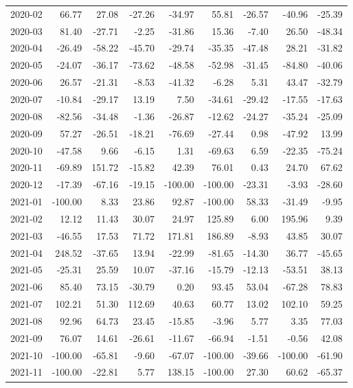 \begin{table}[ht]
\begin{tabular}{lrrrrrrrr}
  2020-02 & 66.77 & 27.08 & -27.26 & -34.97 & 55.81 & -26.57 & -40.96 & -25.39 \\ 
  2020-03 & 81.40 & -27.71 & -2.25 & -31.86 & 15.36 & -7.40 & 26.50 & -48.34 \\ 
  2020-04 & -26.49 & -58.22 & -45.70 & -29.74 & -35.35 & -47.48 & 28.21 & -31.82 \\ 
  2020-05 & -24.07 & -36.17 & -73.62 & -48.58 & -52.98 & -31.45 & -84.80 & -40.06 \\ 
  2020-06 & 26.57 & -21.31 & -8.53 & -41.32 & -6.28 & 5.31 & 43.47 & -32.79 \\ 
  2020-07 & -10.84 & -29.17 & 13.19 & 7.50 & -34.61 & -29.42 & -17.55 & -17.63 \\ 
  2020-08 & -82.56 & -34.48 & -1.36 & -26.87 & -12.62 & -24.27 & -35.24 & -25.09 \\ 
  2020-09 & 57.27 & -26.51 & -18.21 & -76.69 & -27.44 & 0.98 & -47.92 & 13.99 \\ 
  2020-10 & -47.58 & 9.66 & -6.15 & 1.31 & -69.63 & 6.59 & -22.35 & -75.24 \\ 
  2020-11 & -69.89 & 151.72 & -15.82 & 42.39 & 76.01 & 0.43 & 24.70 & 67.62 \\ 
  2020-12 & -17.39 & -67.16 & -19.15 & -100.00 & -100.00 & -23.31 & -3.93 & -28.60 \\ 
  2021-01 & -100.00 & 8.33 & 23.86 & 92.87 & -100.00 & 58.33 & -31.49 & -9.95 \\ 
  2021-02 & 12.12 & 11.43 & 30.07 & 24.97 & 125.89 & 6.00 & 195.96 & 9.39 \\ 
  2021-03 & -46.55 & 17.53 & 71.72 & 171.81 & 186.89 & -8.93 & 43.85 & 30.07 \\ 
  2021-04 & 248.52 & -37.65 & 13.94 & -22.99 & -81.65 & -14.30 & 36.77 & -45.65 \\ 
  2021-05 & -25.31 & 25.59 & 10.07 & -37.16 & -15.79 & -12.13 & -53.51 & 38.13 \\ 
  2021-06 & 85.40 & 73.15 & -30.79 & 0.20 & 93.45 & 53.04 & -67.28 & 78.83 \\ 
  2021-07 & 102.21 & 51.30 & 112.69 & 40.63 & 60.77 & 13.02 & 102.10 & 59.25 \\ 
  2021-08 & 92.96 & 64.73 & 23.45 & -15.85 & -3.96 & 5.77 & 3.35 & 77.03 \\ 
  2021-09 & 76.07 & 14.61 & -26.61 & -11.67 & -66.94 & -1.51 & -0.56 & 42.08 \\ 
  2021-10 & -100.00 & -65.81 & -9.60 & -67.07 & -100.00 & -39.66 & -100.00 & -61.90 \\ 
  2021-11 & -100.00 & -22.81 & 5.77 & 138.15 & -100.00 & 27.30 & 60.62 & -65.37 \\ 

\end{tabular}
\end{table}
